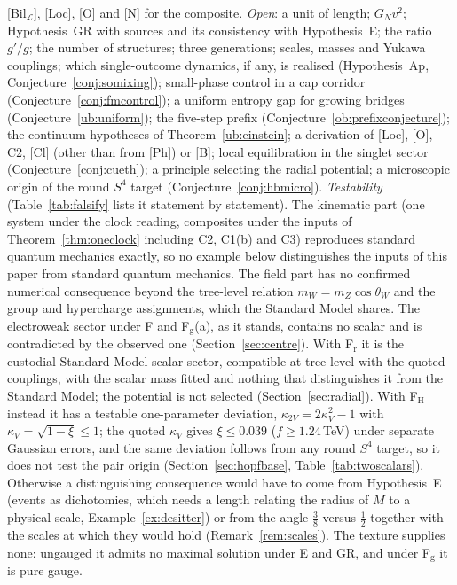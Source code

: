 \documentclass[aps,pra,onecolumn,superscriptaddress,nofootinbib,10pt]{revtex4-2}
\theoremstyle{definition}
\theoremstyle{remark}
\newcommand{\cL}{\mathcal{L}}
\begin{document}
[Bil$_\cL$], [Loc], [O] and [N] for the composite.
\emph{Open}: a unit of length; $G_Nv^2$; Hypothesis~GR with sources and its consistency with
Hypothesis~E; the ratio $g'/g$; the number of structures; three generations; scales, masses and
Yukawa couplings; which single-outcome dynamics, if any, is realised (Hypothesis~Ap, Conjecture~\ref{conj:somixing}); small-phase control
in a cap corridor (Conjecture~\ref{conj:fmcontrol}); a uniform entropy gap for growing bridges (Conjecture~\ref{ub:uniform}); the five-step prefix
(Conjecture~\ref{ob:prefixconjecture});
the continuum hypotheses of Theorem~\ref{ub:einstein}; a derivation of [Loc], [O], C2, [Cl] (other than from [Ph]) or [B]; local equilibration in the
singlet sector (Conjecture~\ref{conj:cueth}); a principle selecting the radial potential; a microscopic origin of the round $S^4$ target
(Conjecture~\ref{conj:hbmicro}).
\emph{Testability} (Table~\ref{tab:falsify} lists it statement by statement).  The kinematic part (one system under the clock reading, composites under the inputs of
Theorem~\ref{thm:oneclock} including C2, C1(b) and C3) reproduces standard quantum mechanics exactly, so no example below distinguishes the inputs
of this paper from standard quantum mechanics.  The field part has no confirmed numerical consequence
beyond the tree-level relation $m_W=m_Z\cos\theta_W$ and the group and hypercharge assignments, which the
Standard Model shares.  The electroweak sector under F and F$_{\mathrm g}$(a), as it stands, contains no scalar and is contradicted by
the observed one (Section~\ref{sec:centre}).  With F$_{\mathrm r}$ it is the custodial Standard Model scalar sector,
compatible at tree level with the quoted couplings, with the scalar mass fitted and nothing that
distinguishes it from the Standard Model; the potential is not selected (Section~\ref{sec:radial}).  With F$_{\mathrm H}$
instead it has a testable one-parameter deviation, $\kappa_{2V}=2\kappa_V^2-1$ with $\kappa_V=\sqrt{1-\xi}\le1$; the quoted $\kappa_V$ gives
$\xi\le0.039$ ($f\ge1.24$\,TeV) under separate Gaussian errors, and the same deviation follows from any round
$S^4$ target, so it does not test the pair origin (Section~\ref{sec:hopfbase}, Table~\ref{tab:twoscalars}).  Otherwise a
distinguishing consequence would have to come from Hypothesis~E (events as
dichotomies, which needs a length relating the radius of $M$ to a physical scale, Example~\ref{ex:desitter})
or from the angle $\tfrac38$ versus $\tfrac12$ together with the scales at which they would hold
(Remark~\ref{rem:scales}).  The texture supplies none: ungauged it admits no maximal solution under E and
GR, and under F$_{\mathrm g}$ it is pure gauge.
\end{document}
